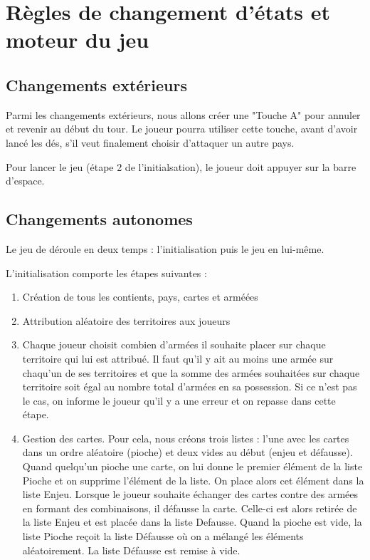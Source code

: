 \section{Règles de changement d'états et moteur du jeu}

\subsection{Changements extérieurs}
Parmi les changements extérieurs, nous allons créer une "Touche A" pour annuler et revenir au début du tour. Le joueur pourra utiliser cette touche, avant d'avoir lancé les dés, s'il veut finalement choisir d'attaquer un autre pays.

Pour lancer le jeu (étape 2 de l'initialsation), le joueur doit appuyer sur la barre d'espace.


\subsection{Changements autonomes}

Le jeu de déroule en deux temps : l'initialisation puis le jeu en lui-même. 

\vspace{0.3cm}
L'initialisation comporte les étapes suivantes : 
\begin{enumerate}
    \item Création de tous les contients, pays, cartes et arméées
    \item Attribution aléatoire des territoires aux joueurs 
    \item Chaque joueur choisit combien d'armées il souhaite placer sur chaque territoire qui lui est attribué. Il faut qu'il y ait au moins une armée sur chaqu'un de ses territoires et que la somme des armées souhaitées sur chaque territoire soit égal au nombre total d'armées en sa possession. Si ce n'est pas le cas, on informe le joueur qu'il y a une erreur et on repasse dans cette étape.
    \item Gestion des cartes. Pour cela, nous créons trois listes :  l’une avec les cartes dans un ordre aléatoire (pioche) et deux vides au début (enjeu et défausse). Quand quelqu’un pioche une carte, on lui donne le premier élément de la liste Pioche et on supprime l’élément de la liste. On place alors cet élément dans la liste Enjeu. Lorsque le joueur souhaite échanger des cartes contre des armées en formant des combinaisons, il défausse la carte. Celle-ci est alors retirée de la liste Enjeu et est placée dans la liste Defausse. Quand la pioche est vide, la liste Pioche reçoit la liste Défausse où on a mélangé les éléments aléatoirement. La liste Défausse est remise à vide.
\end{enumerate}

